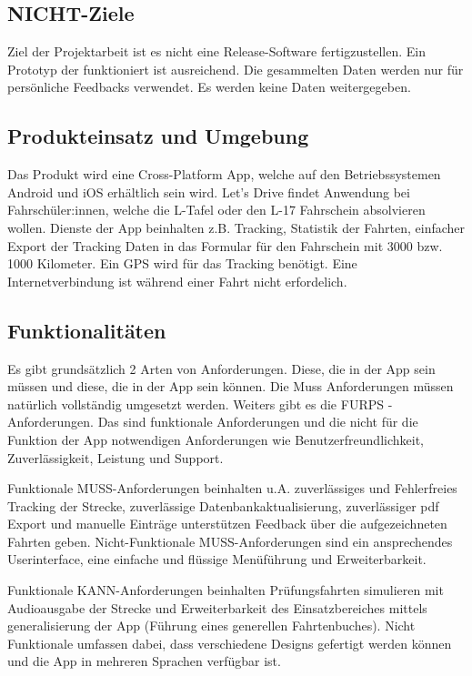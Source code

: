 \subsection{NICHT-Ziele}
Ziel der Projektarbeit ist es nicht eine Release-Software fertigzustellen. Ein Prototyp der funktioniert ist ausreichend. Die gesammelten Daten werden nur für persönliche Feedbacks verwendet. Es werden keine Daten weitergegeben.

\subsection{Produkteinsatz und Umgebung}

	Das Produkt wird eine Cross-Platform App, welche auf den Betriebssystemen Android und iOS erhältlich sein wird. Let's Drive findet Anwendung bei Fahrschüler:innen, welche die L-Tafel oder den L-17 Fahrschein absolvieren wollen. Dienste der App beinhalten z.B. Tracking, Statistik der Fahrten, einfacher Export der Tracking Daten in das Formular für den Fahrschein mit 3000 bzw. 1000 Kilometer. Ein GPS wird für das Tracking benötigt. Eine Internetverbindung ist während einer Fahrt nicht erfordelich.

\subsection{Funktionalitäten}

	Es gibt grundsätzlich 2 Arten von Anforderungen. Diese, die in der App sein müssen und diese, die in der App sein können. Die Muss Anforderungen müssen natürlich vollständig umgesetzt werden. Weiters gibt es die FURPS - Anforderungen. Das sind funktionale Anforderungen und die nicht für die Funktion der App notwendigen Anforderungen wie Benutzerfreundlichkeit, Zuverlässigkeit, Leistung und Support. \par
	Funktionale MUSS-Anforderungen beinhalten u.A. zuverlässiges und Fehlerfreies Tracking der Strecke, zuverlässige Datenbankaktualisierung, zuverlässiger pdf Export und manuelle Einträge unterstützen Feedback über die aufgezeichneten Fahrten geben. Nicht-Funktionale MUSS-Anforderungen sind ein ansprechendes Userinterface, eine einfache und flüssige Menüführung und Erweiterbarkeit. \par
	Funktionale KANN-Anforderungen beinhalten Prüfungsfahrten simulieren mit Audioausgabe der Strecke und Erweiterbarkeit des Einsatzbereiches mittels generalisierung der App (Führung eines generellen Fahrtenbuches). Nicht Funktionale umfassen dabei, dass verschiedene Designs gefertigt werden können und die App in mehreren Sprachen verfügbar ist.

